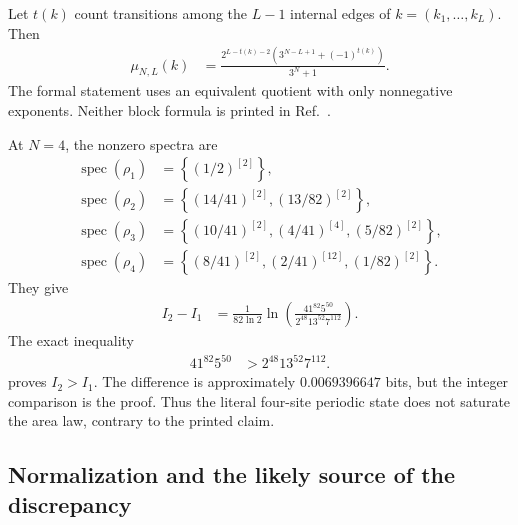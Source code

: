 \documentclass{article}
\begin{document}
Let $t(k)$ count transitions among the $L-1$ internal edges of
$k=(k_1,\ldots,k_L)$. Then
\begin{align}
    \mu_{N,L}(k)
        &= \frac{
            2^{L-t(k)-2}
            \left(3^{N-L+1}+(-1)^{t(k)}\right)}
            {3^N+1}.
    \label{eq:cpsv16_examples_4_10_4_11_entropy_example411_closed_block_probability}
\end{align}
The formal statement uses an equivalent quotient with only nonnegative
exponents. Neither block formula is printed in
Ref.~\cite{Cirac2016MPDO_arXiv}.

At $N=4$, the nonzero spectra are
\begin{align}
    \operatorname{spec}(\rho_1)
        &= \left\{(1/2)^{[2]}\right\},
    \label{eq:cpsv16_examples_4_10_4_11_entropy_example411_spectrum_one}\\
    \operatorname{spec}(\rho_2)
        &= \left\{(14/41)^{[2]},(13/82)^{[2]}\right\},
    \label{eq:cpsv16_examples_4_10_4_11_entropy_example411_spectrum_two}\\
    \operatorname{spec}(\rho_3)
        &= \left\{(10/41)^{[2]},(4/41)^{[4]},
            (5/82)^{[2]}\right\},
    \label{eq:cpsv16_examples_4_10_4_11_entropy_example411_spectrum_three}\\
    \operatorname{spec}(\rho_4)
        &= \left\{(8/41)^{[2]},(2/41)^{[12]},
            (1/82)^{[2]}\right\}.
    \label{eq:cpsv16_examples_4_10_4_11_entropy_example411_spectrum_four}
\end{align}
They give
\begin{align}
    I_2-I_1
        &= \frac{1}{82\ln 2}
            \ln\!\left(\frac{41^{82}5^{50}}
            {2^{48}13^{52}7^{112}}\right).
    \label{eq:cpsv16_examples_4_10_4_11_entropy_example411_exact_defect}
\end{align}
The exact inequality
\begin{align}
    41^{82}5^{50}
        &> 2^{48}13^{52}7^{112}.
    \label{eq:cpsv16_examples_4_10_4_11_entropy_example411_integer_inequality}
\end{align}
proves $I_2>I_1$. The difference is approximately $0.0069396647$ bits, but
the integer comparison is the proof. Thus the literal four-site periodic state
does not saturate the area law, contrary to the printed claim.

\subsection{Normalization and the likely source of the discrepancy}
\end{document}
